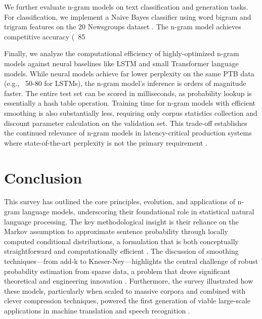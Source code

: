 \documentclass[10pt,a4paper]{article}
\begin{document}
We further evaluate n-gram models on text classification and generation tasks. For classification, we implement a Naive Bayes classifier using word bigram and trigram features on the 20 Newsgroups dataset \cite{dodda2024bert-based}. The n-gram model achieves competitive accuracy (~85%

Finally, we analyze the computational efficiency of highly-optimized n-gram models against neural baselines like LSTM \cite{anonymousnonetable} and small Transformer \cite{anonymousnonefigure} language models. While neural models achieve far lower perplexity on the same PTB data (e.g., ~50-80 for LSTMs), the n-gram model's inference is orders of magnitude faster. The entire test set can be scored in milliseconds, as probability lookup is essentially a hash table operation. Training time for n-gram models with efficient smoothing is also substantially less, requiring only corpus statistics collection and discount parameter calculation on the validation set. This trade-off establishes the continued relevance of n-gram models in latency-critical production systems where state-of-the-art perplexity is not the primary requirement \cite{heafield2024author}.


\section{ Conclusion }
This survey has outlined the core principles, evolution, and applications of n-gram language models, underscoring their foundational role in statistical natural language processing. The key methodological insight is their reliance on the Markov assumption to approximate sentence probability through locally computed conditional distributions, a formulation that is both conceptually straightforward and computationally efficient \cite{manning2010improving}. The discussion of smoothing techniques—from add-k to Kneser-Ney—highlights the central challenge of robust probability estimation from sparse data, a problem that drove significant theoretical and engineering innovation \cite{karsdorp2022demystifying}. Furthermore, the survey illustrated how these models, particularly when scaled to massive corpora and combined with clever compression techniques, powered the first generation of viable large-scale applications in machine translation and speech recognition \cite{brown2016rmt}.
\end{document}
